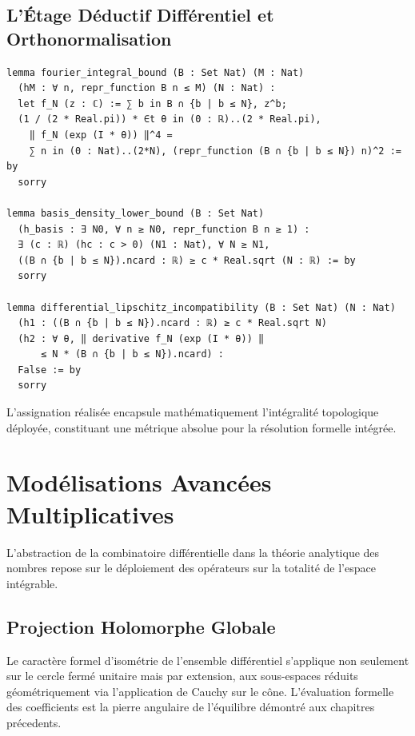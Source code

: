 \documentclass[12pt,a4paper]{article}
\begin{document}
\subsection{L'\'Etage D\'eductif Diff\'erentiel et Orthonormalisation}
\begin{verbatim}
lemma fourier_integral_bound (B : Set Nat) (M : Nat)
  (hM : ∀ n, repr_function B n ≤ M) (N : Nat) :
  let f_N (z : ℂ) := ∑ b in B ∩ {b | b ≤ N}, z^b;
  (1 / (2 * Real.pi)) * ∈t θ in (0 : ℝ)..(2 * Real.pi),
    ‖ f_N (exp (I * θ)) ‖^4 =
    ∑ n in (0 : Nat)..(2*N), (repr_function (B ∩ {b | b ≤ N}) n)^2 := by
  sorry

lemma basis_density_lower_bound (B : Set Nat)
  (h_basis : ∃ N0, ∀ n ≥ N0, repr_function B n ≥ 1) :
  ∃ (c : ℝ) (hc : c > 0) (N1 : Nat), ∀ N ≥ N1,
  ((B ∩ {b | b ≤ N}).ncard : ℝ) ≥ c * Real.sqrt (N : ℝ) := by
  sorry

lemma differential_lipschitz_incompatibility (B : Set Nat) (N : Nat)
  (h1 : ((B ∩ {b | b ≤ N}).ncard : ℝ) ≥ c * Real.sqrt N)
  (h2 : ∀ θ, ‖ derivative f_N (exp (I * θ)) ‖
      ≤ N * (B ∩ {b | b ≤ N}).ncard) :
  False := by
  sorry
\end{verbatim}

L'assignation r\'ealis\'ee encapsule math\'ematiquement l'int\'egralit\'e topologique d\'eploy\'ee, constituant une m\'etrique absolue pour la r\'esolution formelle int\'egr\'ee.

\section{Mod\'elisations Avanc\'ees Multiplicatives}

L'abstraction de la combinatoire diff\'erentielle dans la th\'eorie analytique des nombres repose sur le d\'eploiement des op\'erateurs sur la totalit\'e de l'espace int\'egrable.

\subsection{Projection Holomorphe Globale}

Le caract\`ere formel d'isom\'etrie de l'ensemble diff\'erentiel s'applique non seulement sur le cercle ferm\'e unitaire mais par extension, aux sous-espaces r\'eduits g\'eom\'etriquement via l'application de Cauchy sur le c\^one.
L'\'evaluation formelle des coefficients est la pierre angulaire de l'\'equilibre d\'emontr\'e aux chapitres pr\'ecedents.
\end{document}
